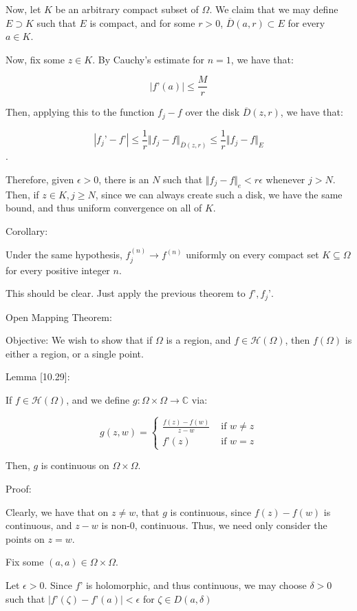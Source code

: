 \documentclass[10pt]{article}
\newcommand{\calH}{\mathcal{H}}
\begin{document}
Now, let $K$ be an arbitrary compact subset of $\Omega$. We claim that we may define $E \supset K$ such that $E$ is compact, and for some $r > 0$, $\overline{D}(a,r) \subset E$ for every $a \in K$.

Now, fix some $z \in K$. By Cauchy’s estimate for $n=1$, we have that:

$$|f’(a)| \leq \frac{M}{r}$$

Then, applying this to the function $ f_j - f$ over the disk $\overline{D}(z,r)$, we have that:

$$| f_j’ - f’| \leq \frac{1}{r} \Vert f_j - f \Vert_{\overline{D}(z,r)} \leq \frac{1}{r}  \Vert f_j - f \Vert_{E} $$.

Therefore, given $\epsilon > 0$, there is an $N$ such that $\Vert f_j - f \Vert_e  < r\epsilon$ whenever $j > N$. Then, if $z \in K, j \geq N$, since we can always create such a disk, we have the same bound, and thus uniform convergence on all of $K$.

Corollary:

Under the same hypothesis, $f^{(n)}_j \to f^{(n)}$ uniformly on every compact set $K \subseteq \Omega$ for every positive integer $n$. 

This should be clear. Just apply the previous theorem to $f’, f_j’$.

Open Mapping Theorem:

Objective: We wish to show that if $\Omega$ is a region, and $f \in \calH(\Omega)$, then $f(\Omega)$ is either a region, or a single point.

Lemma [10.29]:

If $f \in \calH(\Omega)$, and we define $g: \Omega \times \Omega \to \mathbb{C}$ via:

$$ g(z,w) = \begin{cases} \frac{f(z) - f(w)}{z  - w} & \text{ if } w \not = z \\ f’(z) & \text{ if } w = z \end{cases} $$

Then, $g$ is continuous on $\Omega \times \Omega$. 

Proof:

Clearly, we have that on $z \not = w$, that $g$ is continuous, since $f(z) - f(w)$ is continuous, and $z - w$ is non-0, continuous. Thus, we need only consider the points on $z = w$.

Fix some $(a,a) \in \Omega \times \Omega$.

Let $\epsilon > 0$. Since $f’$ is holomorphic, and thus continuous, we may choose $\delta > 0$ such that $| f’(\zeta) - f’(a) | < \epsilon$ for $\zeta \in D(a,\delta)$
\end{document}
